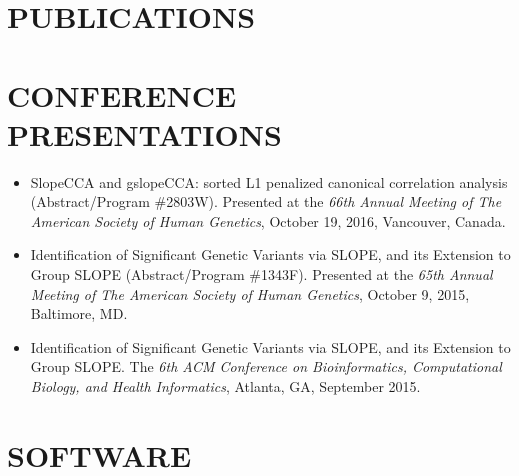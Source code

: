 \documentclass[margin]{res} %
\begin{document}
\begin{resume}

\section{PUBLICATIONS}


\nocite{*}


\section{CONFERENCE PRESENTATIONS}

\begin{itemize} \itemsep -2pt %
    \item SlopeCCA and gslopeCCA: sorted L1 penalized canonical correlation analysis (Abstract/Program \#2803W). Presented at the {\it 66th Annual Meeting of The American Society of Human Genetics}, October 19, 2016, Vancouver, Canada.
    \item Identification of Significant Genetic Variants via SLOPE, and its Extension to Group SLOPE (Abstract/Program \#1343F). Presented at the {\it 65th Annual Meeting of The American Society of Human Genetics}, October 9, 2015, Baltimore, MD.
  \item Identification of Significant Genetic Variants via SLOPE, and its Extension to Group SLOPE. The {\it 6th ACM Conference on Bioinformatics, Computational Biology, and Health Informatics}, Atlanta, GA, September 2015.
\end{itemize}


\section{SOFTWARE}


\end{resume}
\end{document}
